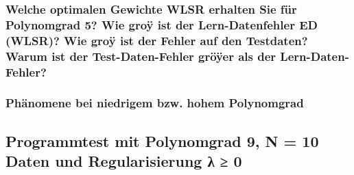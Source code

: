 \subsubsection{Welche optimalen Gewichte WLSR erhalten Sie für Polynomgrad 5? 
                Wie groÿ ist der Lern-Datenfehler ED (WLSR)? 
                Wie groÿ ist der Fehler auf den Testdaten? 
                Warum ist der Test-Daten-Fehler gröÿer als der Lern-Daten-Fehler?}

\subsubsection{Phänomene bei niedrigem bzw. hohem Polynomgrad}


\subsection{Programmtest mit Polynomgrad 9, N = 10 Daten und Regularisierung λ ≥ 0}
